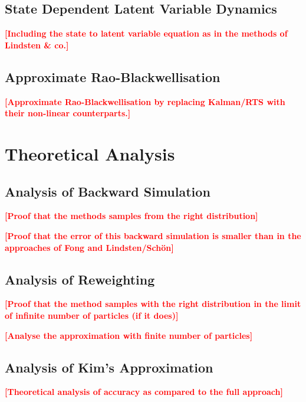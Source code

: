 \documentclass[twocolumn]{autart}    %
\newcommand{\comment}[1]{\textcolor{red}{\textbf{[#1]}}}
\begin{document}
\subsection{State Dependent Latent Variable Dynamics}

\comment{Including the state to latent variable equation as in the
  methods of Lindsten \& co.}



\subsection{Approximate Rao-Blackwellisation}

\comment{Approximate Rao-Blackwellisation by replacing Kalman/RTS
with their non-linear counterparts.}



\section{Theoretical Analysis}

\subsection{Analysis of Backward Simulation}

\comment{Proof that the methods samples from the right distribution}

\comment{Proof that the error of this backward simulation
is smaller than in the approaches of Fong and Lindsten/Sch\"on}



\subsection{Analysis of Reweighting}

\comment{Proof that the method samples with the right distribution
in the limit of infinite number of particles (if it does)}

\comment{Analyse the approximation with finite number of particles}



\subsection{Analysis of Kim's Approximation}

\comment{Theoretical analysis of accuracy as compared to the full
  approach}
\end{document}
